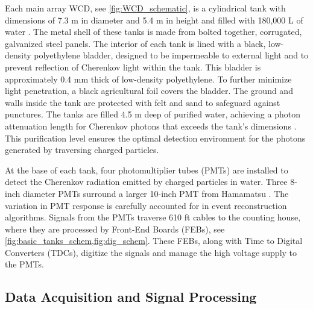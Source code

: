 Each main array WCD, see \cref{fig:WCD_schematic}, is a cylindrical tank with dimensions of 7.3 m in diameter and 5.4 m in height and filled with 180,000 L of water \cite{HAWC_NIM}.
The metal shell of these tanks is made from bolted together, corrugated, galvanized steel panels.
The interior of each tank is lined with a black, low-density polyethylene bladder, designed to be impermeable to external light and to prevent reflection of Cherenkov light within the tank.
This bladder is approximately 0.4 mm thick of low-density polyethylene.
To further minimize light penetration, a black agricultural foil covers the bladder.
The ground and walls inside the tank are protected with felt and sand to safeguard against punctures.
The tanks are filled 4.5 m deep of purified water, achieving a photon attenuation length for Cherenkov photons that exceeds the tank's dimensions \cite{HAWC_NIM}.
This purification level ensures the optimal detection environment for the photons generated by traversing charged particles.

At the base of each tank, four photomultiplier tubes (PMTs) are installed to detect the Cherenkov radiation emitted by charged particles in water.
Three 8-inch diameter PMTs surround a larger 10-inch PMT from Hamamatsu \cite{hawc_pmt}.
The variation in PMT response is carefully accounted for in event reconstruction algorithms.
Signals from the PMTs traverse 610 ft cables to the counting house, where they are processed by Front-End Boards (FEBs), see \cref{fig:basic_tanks_schem,fig:dig_schem}.
These FEBs, along with Time to Digital Converters (TDCs), digitize the signals and manage the high voltage supply to the PMTs.

\subsection{Data Acquisition and Signal Processing} \label{sec:hawc_daq}

